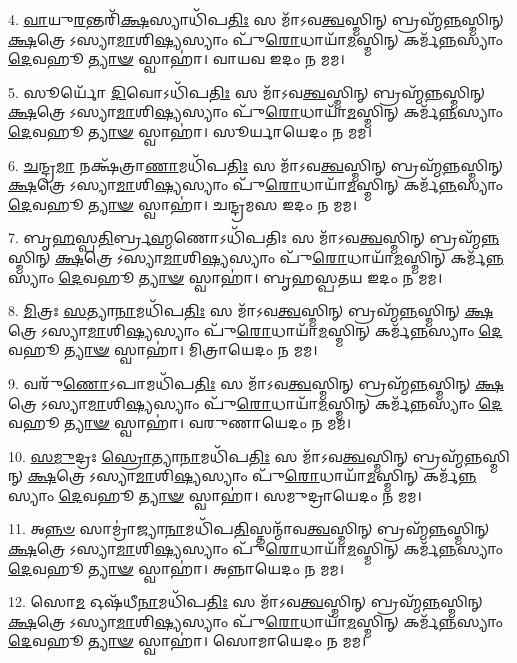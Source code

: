 4. \ul{𑌵𑌾}\-𑌯𑍁\-\ul{𑌰}\-𑌨𑍍𑌤𑌰𑌿᳴\-\ul{𑌕𑍍𑌷}\-𑌸𑍍𑌯𑌾𑌧𑌿᳴𑌪\-\ul{𑌤𑌿𑌃} 𑌸 𑌮𑌾᳴𑌽𑌵\-\ul{𑌤𑍍𑌵}\-𑌸𑍍𑌮𑌿𑌨𑍍 𑌬𑍍𑌰𑌹𑍍𑌮᳴\-\ul{𑌨𑍍𑌨}\-𑌸𑍍𑌮𑌿𑌨𑍍 \ul{𑌕𑍍𑌷}\-𑌤𑍍𑌰𑍇𑌽𑌸𑍍𑌯𑌾\-\ul{𑌮𑌾}\-𑌶𑌿\-\ul{𑌷𑍍𑌯}\-𑌸𑍍𑌯𑌾𑌂 𑌪𑍁᳴\-\ul{𑌰𑍋}\-𑌧𑌾𑌯𑌾᳴\-\ul{𑌮}\-𑌸𑍍𑌮𑌿𑌨𑍍 𑌕𑌰𑍍𑌮᳴\-\ul{𑌨𑍍𑌨}\-𑌸𑍍𑌯𑌾𑌂 \ul{𑌦𑍇}\-𑌵𑌹𑍂\-\ul{𑌤𑍍𑌯𑌾}\-\-\ul{𑍟} 𑌸𑍍𑌵𑌾𑌹𑌾॑। 𑌵𑌾𑌯𑌵 𑌇𑌦𑌂 𑌨 𑌮𑌮।

5. 𑌸𑍂𑌰𑍍𑌯𑍋᳴ \ul{𑌦𑌿}\-𑌵𑍋𑌽𑌧𑌿᳴𑌪\-\ul{𑌤𑌿𑌃} 𑌸 𑌮𑌾᳴𑌽𑌵\-\ul{𑌤𑍍𑌵}\-𑌸𑍍𑌮𑌿𑌨𑍍 𑌬𑍍𑌰𑌹𑍍𑌮᳴\-\ul{𑌨𑍍𑌨}\-𑌸𑍍𑌮𑌿𑌨𑍍 \ul{𑌕𑍍𑌷}\-𑌤𑍍𑌰𑍇𑌽𑌸𑍍𑌯𑌾\-\ul{𑌮𑌾}\-𑌶𑌿\-\ul{𑌷𑍍𑌯}\-𑌸𑍍𑌯𑌾𑌂 𑌪𑍁᳴\-\ul{𑌰𑍋}\-𑌧𑌾𑌯𑌾᳴\-\ul{𑌮}\-𑌸𑍍𑌮𑌿𑌨𑍍 𑌕𑌰𑍍𑌮᳴\-\ul{𑌨𑍍𑌨}\-𑌸𑍍𑌯𑌾𑌂 \ul{𑌦𑍇}\-𑌵𑌹𑍂\-\ul{𑌤𑍍𑌯𑌾}\-\-\ul{𑍟} 𑌸𑍍𑌵𑌾𑌹𑌾॑। 𑌸𑍂𑌰𑍍𑌯𑌾𑌯𑍇𑌦𑌂 𑌨 𑌮𑌮।

6. \ul{𑌚}\-𑌨𑍍𑌦𑍍𑌰\-\ul{𑌮𑌾} 𑌨𑌕𑍍𑌷᳴𑌤𑍍𑌰𑌾\-\ul{𑌣𑌾}\-𑌮𑌧𑌿᳴𑌪\-\ul{𑌤𑌿𑌃} 𑌸 𑌮𑌾᳴𑌽𑌵\-\ul{𑌤𑍍𑌵}\-𑌸𑍍𑌮𑌿𑌨𑍍 𑌬𑍍𑌰𑌹𑍍𑌮᳴\-\ul{𑌨𑍍𑌨}\-𑌸𑍍𑌮𑌿𑌨𑍍 \ul{𑌕𑍍𑌷}\-𑌤𑍍𑌰𑍇𑌽𑌸𑍍𑌯𑌾\-\ul{𑌮𑌾}\-𑌶𑌿\-\ul{𑌷𑍍𑌯}\-𑌸𑍍𑌯𑌾𑌂 𑌪𑍁᳴\-\ul{𑌰𑍋}\-𑌧𑌾𑌯𑌾᳴\-\ul{𑌮}\-𑌸𑍍𑌮𑌿𑌨𑍍 𑌕𑌰𑍍𑌮᳴\-\ul{𑌨𑍍𑌨}\-𑌸𑍍𑌯𑌾𑌂 \ul{𑌦𑍇}\-𑌵𑌹𑍂\-\ul{𑌤𑍍𑌯𑌾}\-\-\ul{𑍟} 𑌸𑍍𑌵𑌾𑌹𑌾॑। 𑌚𑌨𑍍𑌦𑍍𑌰𑌮𑌸 𑌇𑌦𑌂 𑌨 𑌮𑌮।

7. 𑌬𑍃\-\ul{𑌹}\-𑌸𑍍𑌪\-\ul{𑌤𑌿}\-𑌰𑍍𑌬𑍍𑌰\-\ul{𑌹𑍍𑌮}\-𑌣𑍋𑌽𑌧𑌿᳴𑌪𑌤𑌿𑌃 𑌸 𑌮𑌾᳴𑌽𑌵\-\ul{𑌤𑍍𑌵}\-𑌸𑍍𑌮𑌿𑌨𑍍 𑌬𑍍𑌰𑌹𑍍𑌮᳴\-\ul{𑌨𑍍𑌨}\-𑌸𑍍𑌮𑌿𑌨𑍍 \ul{𑌕𑍍𑌷}\-𑌤𑍍𑌰𑍇𑌽𑌸𑍍𑌯𑌾\-\ul{𑌮𑌾}\-𑌶𑌿\-\ul{𑌷𑍍𑌯}\-𑌸𑍍𑌯𑌾𑌂 𑌪𑍁᳴\-\ul{𑌰𑍋}\-𑌧𑌾𑌯𑌾᳴\-\ul{𑌮}\-𑌸𑍍𑌮𑌿𑌨𑍍 𑌕𑌰𑍍𑌮᳴\-\ul{𑌨𑍍𑌨}\-𑌸𑍍𑌯𑌾𑌂 \ul{𑌦𑍇}\-𑌵𑌹𑍂\-\ul{𑌤𑍍𑌯𑌾}\-\-\ul{𑍟} 𑌸𑍍𑌵𑌾𑌹𑌾॑। 𑌬𑍃𑌹𑌸𑍍𑌪𑌤𑌯 𑌇𑌦𑌂 𑌨 𑌮𑌮।

8. \ul{𑌮𑌿}\-𑌤𑍍𑌰𑌃 \ul{𑌸}\-𑌤𑍍𑌯𑌾\-\ul{𑌨𑌾}\-𑌮𑌧𑌿᳴𑌪\-\ul{𑌤𑌿𑌃} 𑌸 𑌮𑌾᳴𑌽𑌵\-\ul{𑌤𑍍𑌵}\-𑌸𑍍𑌮𑌿𑌨𑍍 𑌬𑍍𑌰𑌹𑍍𑌮᳴\-\ul{𑌨𑍍𑌨}\-𑌸𑍍𑌮𑌿𑌨𑍍 \ul{𑌕𑍍𑌷}\-𑌤𑍍𑌰𑍇𑌽𑌸𑍍𑌯𑌾\-\ul{𑌮𑌾}\-𑌶𑌿\-\ul{𑌷𑍍𑌯}\-𑌸𑍍𑌯𑌾𑌂 𑌪𑍁᳴\-\ul{𑌰𑍋}\-𑌧𑌾𑌯𑌾᳴\-\ul{𑌮}\-𑌸𑍍𑌮𑌿𑌨𑍍 𑌕𑌰𑍍𑌮᳴\-\ul{𑌨𑍍𑌨}\-𑌸𑍍𑌯𑌾𑌂 \ul{𑌦𑍇}\-𑌵𑌹𑍂\-\ul{𑌤𑍍𑌯𑌾}\-\-\ul{𑍟} 𑌸𑍍𑌵𑌾𑌹𑌾॑। 𑌮𑌿𑌤𑍍𑌰𑌾𑌯𑍇𑌦𑌂 𑌨 𑌮𑌮।

9. 𑌵𑌰𑍁᳴\-\ul{𑌣𑍋}\-𑌽𑌪𑌾𑌮𑌧𑌿᳴𑌪\-\ul{𑌤𑌿𑌃} 𑌸 𑌮𑌾᳴𑌽𑌵\-\ul{𑌤𑍍𑌵}\-𑌸𑍍𑌮𑌿𑌨𑍍 𑌬𑍍𑌰𑌹𑍍𑌮᳴\-\ul{𑌨𑍍𑌨}\-𑌸𑍍𑌮𑌿𑌨𑍍 \ul{𑌕𑍍𑌷}\-𑌤𑍍𑌰𑍇𑌽𑌸𑍍𑌯𑌾\-\ul{𑌮𑌾}\-𑌶𑌿\-\ul{𑌷𑍍𑌯}\-𑌸𑍍𑌯𑌾𑌂 𑌪𑍁᳴\-\ul{𑌰𑍋}\-𑌧𑌾𑌯𑌾᳴\-\ul{𑌮}\-𑌸𑍍𑌮𑌿𑌨𑍍 𑌕𑌰𑍍𑌮᳴\-\ul{𑌨𑍍𑌨}\-𑌸𑍍𑌯𑌾𑌂 \ul{𑌦𑍇}\-𑌵𑌹𑍂\-\ul{𑌤𑍍𑌯𑌾}\-\-\ul{𑍟} 𑌸𑍍𑌵𑌾𑌹𑌾॑। 𑌵𑌰𑍁𑌣𑌾𑌯𑍇𑌦𑌂 𑌨 𑌮𑌮।

10. \ul{𑌸}\-\-\ul{𑌮𑍁}\-𑌦𑍍𑌰𑌃 \ul{𑌸𑍍𑌰𑍋}\-𑌤𑍍𑌯𑌾\-\ul{𑌨𑌾}\-𑌮𑌧𑌿᳴𑌪\-\ul{𑌤𑌿𑌃} 𑌸 𑌮𑌾᳴𑌽𑌵\-\ul{𑌤𑍍𑌵}\-𑌸𑍍𑌮𑌿𑌨𑍍 𑌬𑍍𑌰𑌹𑍍𑌮᳴\-\ul{𑌨𑍍𑌨}\-𑌸𑍍𑌮𑌿𑌨𑍍 \ul{𑌕𑍍𑌷}\-𑌤𑍍𑌰𑍇𑌽𑌸𑍍𑌯𑌾\-\ul{𑌮𑌾}\-𑌶𑌿\-\ul{𑌷𑍍𑌯}\-𑌸𑍍𑌯𑌾𑌂 𑌪𑍁᳴\-\ul{𑌰𑍋}\-𑌧𑌾𑌯𑌾᳴\-\ul{𑌮}\-𑌸𑍍𑌮𑌿𑌨𑍍 𑌕𑌰𑍍𑌮᳴\-\ul{𑌨𑍍𑌨}\-𑌸𑍍𑌯𑌾𑌂 \ul{𑌦𑍇}\-𑌵𑌹𑍂\-\ul{𑌤𑍍𑌯𑌾}\-\-\ul{𑍟} 𑌸𑍍𑌵𑌾𑌹𑌾॑। 𑌸𑌮𑍁𑌦𑍍𑌰𑌾𑌯𑍇𑌦𑌂 𑌨 𑌮𑌮।

11. 𑌅\-\ul{𑌨𑍍𑌨}\-\-\ul{𑍞} 𑌸𑌾𑌮𑍍𑌰𑌾॑𑌜𑍍𑌯𑌾\-\ul{𑌨𑌾}\-𑌮𑌧𑌿᳴𑌪\-\ul{𑌤𑌿}\-𑌸𑍍𑌤𑌨𑍍𑌮𑌾᳴𑌵\-\ul{𑌤𑍍𑌵}\-𑌸𑍍𑌮𑌿𑌨𑍍 𑌬𑍍𑌰𑌹𑍍𑌮᳴\-\ul{𑌨𑍍𑌨}\-𑌸𑍍𑌮𑌿𑌨𑍍 \ul{𑌕𑍍𑌷}\-𑌤𑍍𑌰𑍇𑌽𑌸𑍍𑌯𑌾\-\ul{𑌮𑌾}\-𑌶𑌿\-\ul{𑌷𑍍𑌯}\-𑌸𑍍𑌯𑌾𑌂 𑌪𑍁᳴\-\ul{𑌰𑍋}\-𑌧𑌾𑌯𑌾᳴\-\ul{𑌮}\-𑌸𑍍𑌮𑌿𑌨𑍍 𑌕𑌰𑍍𑌮᳴\-\ul{𑌨𑍍𑌨}\-𑌸𑍍𑌯𑌾𑌂 \ul{𑌦𑍇}\-𑌵𑌹𑍂\-\ul{𑌤𑍍𑌯𑌾}\-\-\ul{𑍟} 𑌸𑍍𑌵𑌾𑌹𑌾॑। 𑌅𑌨𑍍𑌨𑌾𑌯𑍇𑌦𑌂 𑌨 𑌮𑌮।

12. 𑌸𑍋\-\ul{𑌮} 𑌓𑌷᳴𑌧𑍀\-\ul{𑌨𑌾}\-𑌮𑌧𑌿᳴𑌪\-\ul{𑌤𑌿𑌃} 𑌸 𑌮𑌾᳴𑌽𑌵\-\ul{𑌤𑍍𑌵}\-𑌸𑍍𑌮𑌿𑌨𑍍 𑌬𑍍𑌰𑌹𑍍𑌮᳴\-\ul{𑌨𑍍𑌨}\-𑌸𑍍𑌮𑌿𑌨𑍍 \ul{𑌕𑍍𑌷}\-𑌤𑍍𑌰𑍇𑌽𑌸𑍍𑌯𑌾\-\ul{𑌮𑌾}\-𑌶𑌿\-\ul{𑌷𑍍𑌯}\-𑌸𑍍𑌯𑌾𑌂 𑌪𑍁᳴\-\ul{𑌰𑍋}\-𑌧𑌾𑌯𑌾᳴\-\ul{𑌮}\-𑌸𑍍𑌮𑌿𑌨𑍍 𑌕𑌰𑍍𑌮᳴\-\ul{𑌨𑍍𑌨}\-𑌸𑍍𑌯𑌾𑌂 \ul{𑌦𑍇}\-𑌵𑌹𑍂\-\ul{𑌤𑍍𑌯𑌾}\-\-\ul{𑍟} 𑌸𑍍𑌵𑌾𑌹𑌾॑। 𑌸𑍋𑌮𑌾𑌯𑍇𑌦𑌂 𑌨 𑌮𑌮।

